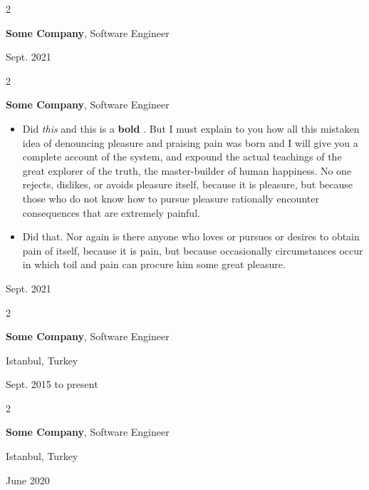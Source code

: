 \documentclass[10pt, letterpaper]{article}
\newenvironment{highlights}{
    \begin{itemize}[
        topsep=0.10 cm,
        parsep=0.10 cm,
        partopsep=0pt,
        itemsep=0pt,
        leftmargin=0.4 cm + 10pt
    ]
}{
    \end{itemize}
} %
\newenvironment{twocolentry}[2][]{
    \onecolentry
    \def\secondColumn{#2}
    \setcolumnwidth{\fill, 4.5 cm}
    \begin{paracol}{2}
}{
    \switchcolumn \raggedleft \secondColumn
    \end{paracol}
    \endonecolentry
} %
\let\hrefWithoutArrow\href
\renewcommand{\href}[2]{\hrefWithoutArrow{#1}{\mbox{\ifthenelse{\equal{#2}{}}{ }{#2 }\raisebox{.15ex}{\footnotesize \faExternalLink*}}}}
\begin{document}
        \begin{twocolentry}{
            Sept. 2021
        }
            \textbf{Some \textnormal{Company}}, Software Engineer
        \end{twocolentry}


        \vspace{0.2 cm}

        \begin{twocolentry}{
            Sept. 2021
        }
            \textbf{Some \textnormal{Company}}, Software Engineer
            \begin{highlights}
                \item Did \textit{this} and this is a \textbf{bold} \href{https://example.com}{link}. But I must explain to you how all this mistaken idea of denouncing pleasure and praising pain was born and I will give you a complete account of the system, and expound the actual teachings of the great explorer of the truth, the master-builder of human happiness. No one rejects, dislikes, or avoids pleasure itself, because it is pleasure, but because those who do not know how to pursue pleasure rationally encounter consequences that are extremely painful.
                \item Did that. Nor again is there anyone who loves or pursues or desires to obtain pain of itself, because it is pain, but because occasionally circumstances occur in which toil and pain can procure him some great pleasure.
            \end{highlights}
        \end{twocolentry}


        \vspace{0.2 cm}

        \begin{twocolentry}{
            Istanbul, Turkey

        Sept. 2015 to present
        }
            \textbf{Some \textnormal{Company}}, Software Engineer
        \end{twocolentry}


        \vspace{0.2 cm}

        \begin{twocolentry}{
            Istanbul, Turkey

        June 2020
        }
            \textbf{Some \textnormal{Company}}, Software Engineer
        \end{twocolentry}


        \vspace{0.2 cm}
\end{document}
